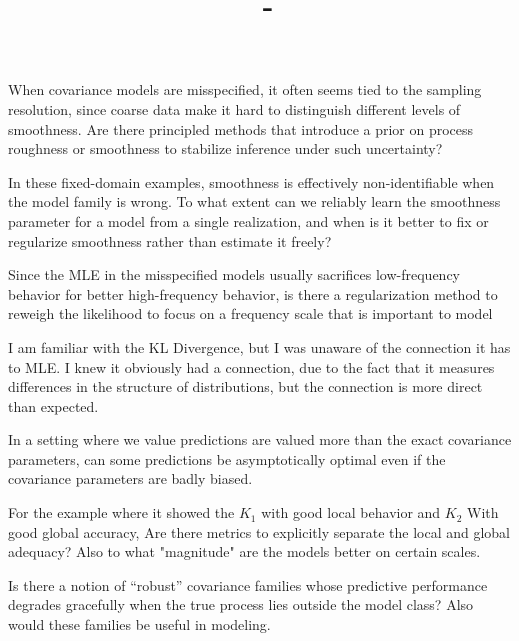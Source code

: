 \documentclass[answers,12pt,addpoints]{exam}
\author{\name}
\title{\course \ - \assignment}
\begin{document}
\maketitle

\begin{questions}
\question When covariance models are misspecified, it often seems tied to the sampling resolution, since coarse data make it hard to distinguish different levels of smoothness. Are there principled methods that introduce a prior on process roughness or smoothness to stabilize inference under such uncertainty?

\question In these fixed-domain examples, smoothness is effectively
non-identifiable when the model family is wrong. To what extent can we reliably learn the smoothness parameter for a model from a single realization, and when is it better to fix or regularize
smoothness rather than estimate it freely?

\question Since the MLE in the misspecified models usually sacrifices low-frequency behavior for better high-frequency behavior, is there a regularization method to reweigh the likelihood to focus on a frequency scale that is important to model

\question I am familiar with the KL Divergence, but I was unaware of the connection it has to MLE. I knew it obviously had a connection, due to the fact that it measures differences in the structure of distributions, but the connection is more direct than expected.

\question In a setting where we value predictions are valued more than the exact covariance parameters, can some predictions be asymptotically optimal even if the covariance parameters are badly biased.

\question For the example where it showed the $K_1$ with good local behavior and $K_2$ With good global accuracy, Are there metrics to explicitly separate the local and global adequacy? Also to what "magnitude" are the models better on certain scales. 

\question  Is there a notion of “robust” covariance families whose predictive performance degrades gracefully when the true process lies outside the model class? Also would these families be useful in modeling.



\end{questions}
\end{document}
